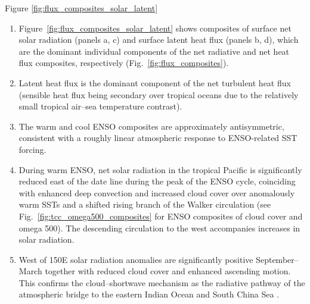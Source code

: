 \documentclass[aspectratio=169,xcolor=dvipsnames]{beamer}
\begin{document}
\begin{frame}{Figure \ref{fig:flux_composites_solar_latent}}
  \begin{enumerate}\fontsize{5pt}{7pt}\selectfont

  \item Figure~\ref{fig:flux_composites_solar_latent} shows composites
    of surface net solar radiation (panels a, c) and surface latent
    heat flux (panels b, d), which are the dominant individual
    components of the net radiative and net heat flux composites,
    respectively (Fig.\ \ref{fig:flux_composites}).

  \item Latent heat flux is the dominant component of the net
    turbulent heat flux (sensible heat flux being secondary over
    tropical oceans due to the relatively small tropical air–sea
    temperature contrast).
  
  \item The warm and cool ENSO composites are approximately
    antisymmetric, consistent with a roughly linear atmospheric
    response to ENSO-related SST forcing.
  

  \item During warm ENSO, net solar radiation in the tropical Pacific
    is significantly reduced east of the date line during the peak of
    the ENSO cycle, coinciding with enhanced deep convection and
    increased cloud cover over anomalously warm SSTs and a shifted
    rising branch of the Walker circulation (see Fig.\
    \ref{fig:tcc_omega500_composites} for ENSO composites of cloud
    cover and omega 500). The descending circulation to the west
    accompanies increases in solar radiation.

  \item West of 150E solar radiation anomalies are significantly
    positive September--March together with reduced cloud cover and
    enhanced ascending motion. This confirms the cloud--shortwave
    mechanism as the radiative pathway of the atmospheric bridge to
    the eastern Indian Ocean and South China Sea
    \citep{Klein1999remote}.


\end{enumerate}
\end{frame}
\end{document}

